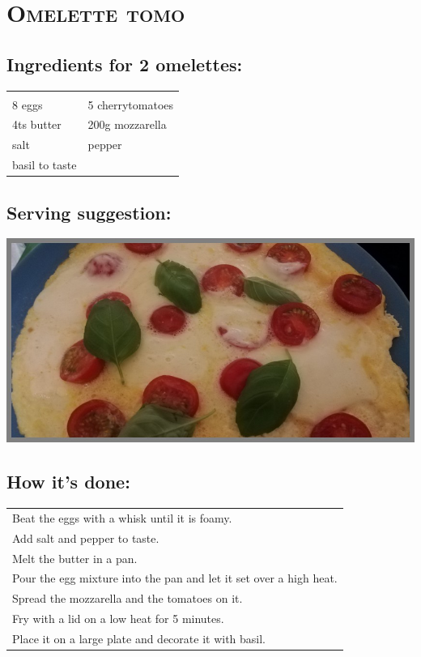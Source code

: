 \section{\textsc{Omelette tomo}}

\subsection*{Ingredients for 2 omelettes:}

\begin{tabular}{p{7.5cm} p{7.5cm}}
	& \\
	8 eggs & 5 cherrytomatoes \\
	4ts butter & 200g mozzarella \\
	salt & pepper \\
	basil to taste &
\end{tabular}

\subsection*{Serving suggestion:}

\includegraphics[width=\textwidth]{img/omlett_tomo.jpg} \cite{omlettomo}

\subsection*{How it's done:}

\begin{tabular}{p{15cm}}
	\\
  Beat the eggs with a whisk until it is foamy.\\
  Add salt and pepper to taste.\\
  Melt the butter in a pan.\\
  Pour the egg mixture into the pan and let it set over a high heat.\\
  Spread the mozzarella and the tomatoes on it.\\
  Fry with a lid on a low heat for 5 minutes.\\
  Place it on a large plate and decorate it with basil.
\end{tabular}
